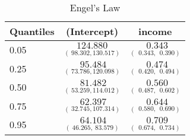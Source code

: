 %
\begin{table}[hptb]
\caption{Engel's Law\label{fit2}}
\begin{center}
\begin{tabular}{|l||c|c|} \hline
\multicolumn{1}{|l||}{Quantiles}&\multicolumn{1}{c|}{(Intercept)}&\multicolumn{1}{c|}{income}\\ \hline
0.05&$\underset{(~98.302,130.517)}{124.880}$&$\underset{(~~0.343,~~0.390)}{~~0.343}$\\ 
0.25&$\underset{(~73.786,120.098)}{~95.484}$&$\underset{(~~0.420,~~0.494)}{~~0.474}$\\ 
0.50&$\underset{(~53.259,114.012)}{~81.482}$&$\underset{(~~0.487,~~0.602)}{~~0.560}$\\ 
0.75&$\underset{(~32.745,107.314)}{~62.397}$&$\underset{(~~0.580,~~0.690)}{~~0.644}$\\ 
0.95&$\underset{(~46.265,~83.579)}{~64.104}$&$\underset{(~~0.674,~~0.734)}{~~0.709}$\\ 
\hline
\end{tabular}
\vspace{3mm}
\end{center}
\end{table}
